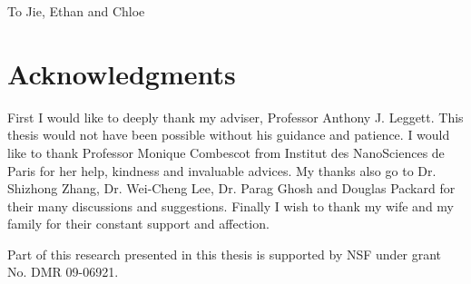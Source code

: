 \documentclass[edeposit,fullpage,prequest,10pt]{uiucthesis2009}
\begin{document}
\begin{dedication}
To Jie, Ethan and Chloe
\end{dedication}

\chapter*{Acknowledgments}
First I would like to deeply thank my adviser, Professor  Anthony J. Leggett.  This thesis would not have been possible without his guidance and patience.  I would like to thank Professor Monique Combescot from Institut des NanoSciences de Paris for her help, kindness and  invaluable advices.  My thanks also go to  Dr. Shizhong Zhang, Dr. Wei-Cheng Lee, Dr. Parag Ghosh and   Douglas
Packard  for their many discussions and suggestions.  Finally I wish to  thank my wife and my family for their constant support and affection.  

Part of this research presented in  this thesis  is supported  by NSF under grant No. DMR 09-06921. 


\tableofcontents
\listoffigures

%
\end{document}
